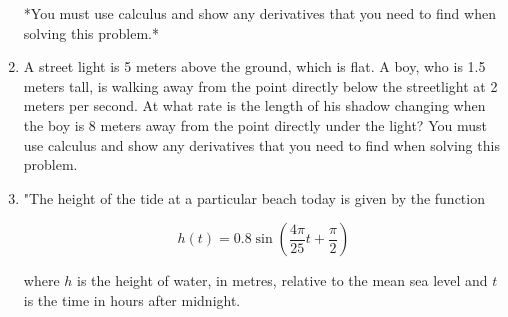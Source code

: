 \documentclass{article}
\begin{document}
\begin{enumerate}
*You must use calculus and show any derivatives that you need to find when solving this problem.*
\vspace{3cm}
\item A street light is 5 meters above the ground, which is flat. A boy, who is 1.5 meters tall, is walking away from the point directly below the streetlight at 2 meters per second. At what rate is the length of his shadow changing when the boy is 8 meters away from the point directly under the light? You must use calculus and show any derivatives that you need to find when solving this problem.
\vspace{3cm}
\item "The height of the tide at a particular beach today is given by the function

\[ h(t) = 0.8 \sin \left( \frac{4\pi}{25} t + \frac{\pi}{2} \right) \]

where \( h \) is the height of water, in metres, relative to the mean sea level and \( t \) is the time in hours after midnight.


\end{enumerate}
\end{document}
